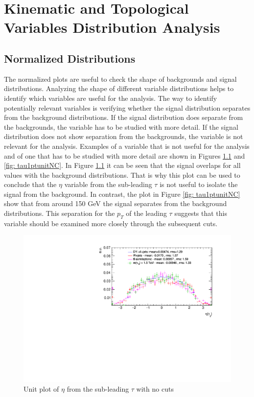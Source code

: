 \graphicspath{{DistributionAnalysis/Figures/}}

\chapter{Kinematic and Topological Variables Distribution Analysis} \label{sec: disanalysis}

\section{Normalized Distributions}\label{sec: Normalized Distributions}

The normalized plots are useful to check the shape of backgrounds and signal distributions. Analyzing the shape of different variable distributions helps to identify which variables are useful for the analysis. The way to identify potentially relevant variables is verifying whether the signal distribution separates from the background distributions. If the signal distribution does separate from the backgrounds, the variable has to be studied with more detail. If the signal distribution does not show separation from the backgrounds, the variable is not relevant for the analysis. Examples of a variable that is not useful for the analysis and of one that has to be studied with more detail are shown in Figures \ref{fig: tau2etaunitNC} and \ref{fig: tau1ptunitNC}. In Figure \ref{fig: tau2etaunitNC} it can be seen that the signal overlaps for all values with the background distributions. That is why this plot can be used to conclude that the $\eta$ variable from the sub-leading $\tau$ is not useful to isolate the signal from the background. In contrast, the plot in Figure \ref{fig: tau1ptunitNC} show that from around 150 GeV the signal separates from the background distributions. This separation for the $p_{T}$ of the leading $\tau$ suggests that this variable should be examined more closely through the subsequent cuts. 

\begin{figure}
\centering
\includegraphics[width=\linewidth]{Plots/tau2_eta_unitNC.pdf}
\caption{Unit plot of $\eta$ from the sub-leading $\tau$ with no cuts}
\label{fig: tau2etaunitNC}
\end{figure}

